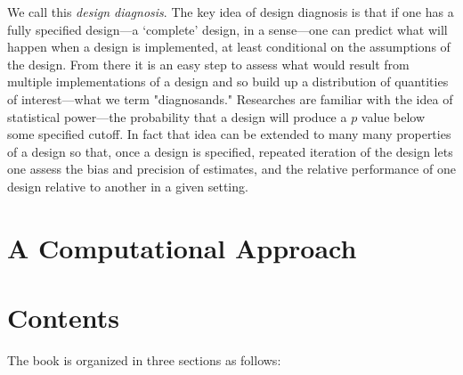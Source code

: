 \documentclass[11pt]{article}
\begin{document}
We call this \textit{design diagnosis}. The key idea of design diagnosis is that if one has a fully specified design---a `complete' design, in a sense---one can predict what will happen when a design is implemented, at least conditional on the assumptions of the design. From there it is an easy step to assess what would result from multiple implementations of a design and so build up a distribution of quantities of interest---what we term "diagnosands." Researches are familiar with the idea of statistical power---the probability that a design will produce a $p$ value below some specified cutoff. In fact that idea can be extended to many many properties of a design so that, once a design is specified, repeated iteration of the design lets one assess the bias and precision of estimates, and the relative performance of one design relative to another in a given setting. 


\section{A Computational Approach}



\section{Contents}

The book is organized in three sections as follows:
\end{document}
